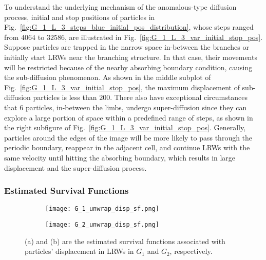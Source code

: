       To understand the underlying mechanism of the anomalous-type
      diffusion process, initial and stop positions of particles in
      Fig.~\ref{fig:G_1_L_3_steps_blue_initial_pos_distribution},
      whose steps ranged from $4064$ to $32586$, are illustrated in
      Fig.~\ref{fig:G_1_L_3_var_initial_stop_pos}. Suppose particles
      are trapped in the narrow space in-between the branches or
      initially start LRWs near the branching structure. In that case,
      their movements will be restricted because of the nearby
      absorbing boundary condition, causing the sub-diffusion
      phenomenon. As shown in the middle subplot of
      Fig.~\ref{fig:G_1_L_3_var_initial_stop_pos}, the maximum
      displacement of sub-diffusion particles is less than
      $200$. There also have exceptional circumstances that $6$
      particles, in-between the limbs, undergo super-diffusion since
      they can explore a large portion of space within a predefined
      range of steps, as shown in the right subfigure of
      Fig.~\ref{fig:G_1_L_3_var_initial_stop_pos}. Generally,
      particles around the edges of the image will be more likely to
      pass through the periodic boundary, reappear in the adjacent
      cell, and continue LRWs with the same velocity until hitting the
      absorbing boundary, which results in large displacement and the
      super-diffusion process.
      
      

      \subsubsection{Estimated Survival Functions}
      
      \begin{figure}
        \centering
        \begin{subfigure}[b]{0.45\textwidth}
          \texttt{[image: G\_1\_unwrap\_disp\_sf.png]}
          \caption{}
          \label{fig:sf_g1_branch_disp}
        \end{subfigure}
        \hfill
        \begin{subfigure}[b]{0.45\textwidth}
          \texttt{[image: G\_2\_unwrap\_disp\_sf.png]}
          \caption{}
          \label{fig:sf_g2_branch_disp}
        \end{subfigure}
        \caption{(a) and (b) are the estimated survival functions
          associated with particles' displacement in LRWs in $G_1$ and
          $G_2$, respectively.}
        \label{fig:sf_branch_disp}
      \end{figure}

